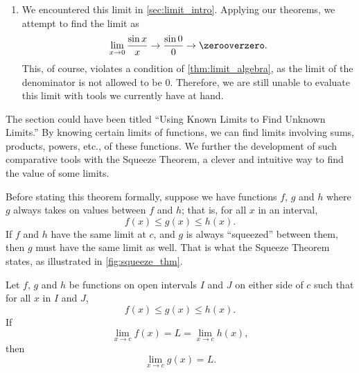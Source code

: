 \begin{example}
\begin{enumerate}
	\item	We encountered this limit in \autoref{sec:limit_intro}. Applying our theorems, we attempt to find the limit as
	\[\lim_{x\to 0}\frac{\sin x}{x}\to\frac{\sin 0}{0} \to\zerooverzero.\]
	This, of course, violates a condition of \autoref{thm:limit_algebra}, as the limit of the denominator is not allowed to be 0. Therefore, we are still unable to evaluate this limit with tools we currently have at hand.
\end{enumerate}
\end{example}

The section could have been titled ``Using Known Limits to Find Unknown Limits.'' By knowing certain limits of functions, we can find limits involving sums, products, powers, etc., of these functions. We further the development of such comparative tools with the Squeeze Theorem, a clever and intuitive way to find the value of some limits.

Before stating this theorem formally, suppose we have functions $f$, $g$ and $h$ where $g$ always takes on values between $f$ and $h$; that is, for all $x$ in an interval,
\[f(x) \leq g(x) \leq h(x).\]
If $f$ and $h$ have the same limit at $c$, and $g$  is always ``squeezed'' between them, then $g$ must have the same limit as well. That is what the Squeeze Theorem states, as illustrated in \autoref{fig:squeeze_thm}.


\begin{theorem}\label{thm:sqz}
Let $f$, $g$ and $h$ be functions on open intervals $I$ and $J$ on either side of $c$ such that for all $x$ in $I$ and $J$,\vspace{-.3\baselineskip}
\[f(x)\leq g(x) \leq h(x).\]
If\vspace{-.4\baselineskip}
\[\lim_{x\to c} f(x) = L = \lim_{x\to c} h(x),\]
then\vspace{-.4\baselineskip}
\[\lim_{x\to c} g(x) = L.\]
\end{theorem}

